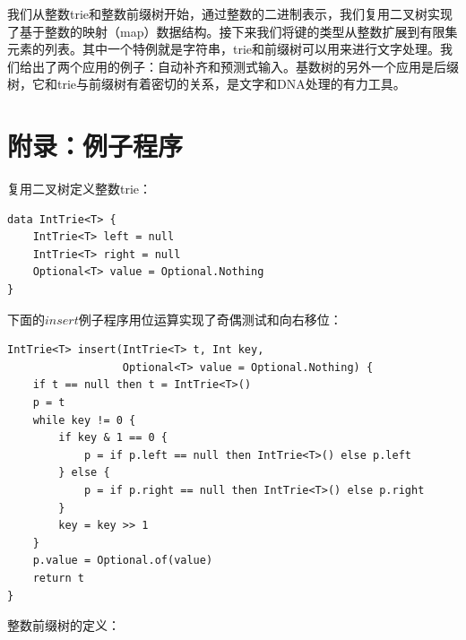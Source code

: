 \documentclass[b5paper]{ctexart}
\begin{document}
我们从整数trie和整数前缀树开始，通过整数的二进制表示，我们复用二叉树实现了基于整数的映射（map）数据结构。接下来我们将键的类型从整数扩展到有限集元素的列表。其中一个特例就是字符串，trie和前缀树可以用来进行文字处理。我们给出了两个应用的例子：自动补齐和预测式输入。基数树的另外一个应用是后缀树，它和trie与前缀树有着密切的关系，是文字和DNA处理的有力工具。

\begin{Exercise}
\end{Exercise}

\section{附录：例子程序}

复用二叉树定义整数trie：

\begin{lstlisting}[language = Bourbaki]
data IntTrie<T> {
    IntTrie<T> left = null
    IntTrie<T> right = null
    Optional<T> value = Optional.Nothing
}
\end{lstlisting}

下面的$insert$例子程序用位运算实现了奇偶测试和向右移位：

\begin{lstlisting}[language = Bourbaki]
IntTrie<T> insert(IntTrie<T> t, Int key,
                  Optional<T> value = Optional.Nothing) {
    if t == null then t = IntTrie<T>()
    p = t
    while key != 0 {
        if key & 1 == 0 {
            p = if p.left == null then IntTrie<T>() else p.left
        } else {
            p = if p.right == null then IntTrie<T>() else p.right
        }
        key = key >> 1
    }
    p.value = Optional.of(value)
    return t
}
\end{lstlisting}



整数前缀树的定义：
\end{document}
